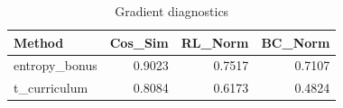 \begin{table}[htbp]
\centering
\caption{Gradient diagnostics}
\label{tab:grad-diag}
\begin{tabular}{lrrr}
\toprule
\textbf{Method} & \textbf{Cos\_Sim} & \textbf{RL\_Norm} & \textbf{BC\_Norm} \\
\midrule
entropy\_bonus & 0.9023 & 0.7517 & 0.7107 \\
t\_curriculum & 0.8084 & 0.6173 & 0.4824 \\
\bottomrule
\end{tabular}
\end{table}